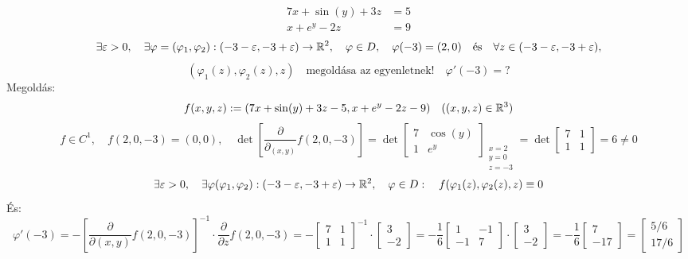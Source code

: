 \documentclass[a4paper,11.5pt]{article}
\begin{document}
	\begin{task}
		 \begin{align*}
			7x+\sin(y)+3z&=5\\
			x+e^y-2z&=9
		\end{align*}
		\[ \exists\varepsilon>0,\quad \exists\varphi=(\varphi_1,\varphi_2):(-3-\varepsilon,-3+\varepsilon)\to\mathbb{R}^2,\quad \varphi\in D,\quad \varphi(-3)=(2,0)\quad \text{és}\quad \forall z\in(-3-\varepsilon,-3+\varepsilon), \]
		\[(\varphi_1(z),\varphi_2(z),z)\quad \text{megoldása az egyenletnek!}\quad \varphi'(-3)=?  \]
		Megoldás:
		\[ f(x,y,z):=(7x+\sin(y)+3z-5,x+e^y-2z-9)\quad ((x,y,z)\in\mathbb{R}^3) \]
		\[ f\in C^1,\quad f(2,0,-3)=(0,0),\quad \det\left[\frac{\partial}{\partial_{(x,y)}}f(2,0,-3)\right]=\det \begin{bmatrix}
			7&\cos(y)\\
			1&e^y
		\end{bmatrix}_{\substack{x=2\\y=0\\z=-3}}=\det \begin{bmatrix}
			7&1\\
			1&1
		\end{bmatrix}=6\not=0 \]
		\[ \exists\varepsilon>0,\quad \exists\varphi(\varphi_1,\varphi_2):(-3-\varepsilon,-3+\varepsilon)\to\mathbb{R}^2,\quad \varphi\in D:\quad f(\varphi_1(z),\varphi_2(z),z)\equiv0 \]
		És:
		\[ \varphi'(-3)=-\left[\frac{\partial}{\partial(x,y)}f(2,0,-3)\right]^{-1}\cdot\frac{\partial}{\partial z}f(2,0,-3)=-\begin{bmatrix}
			7&1\\
			1&1
		\end{bmatrix}^{-1}\cdot \begin{bmatrix}
		3\\
		-2
		\end{bmatrix}=-\frac{1}{6} \begin{bmatrix}
			1&-1\\
			-1&7
		\end{bmatrix} \cdot \begin{bmatrix}
			3\\
			-2
		\end{bmatrix}=-\frac{1}{6} \begin{bmatrix}
			7\\
			-17
		\end{bmatrix}= \begin{bmatrix}
		5/6\\
		17/6
		\end{bmatrix} \]
	\end{task}
\end{document}
